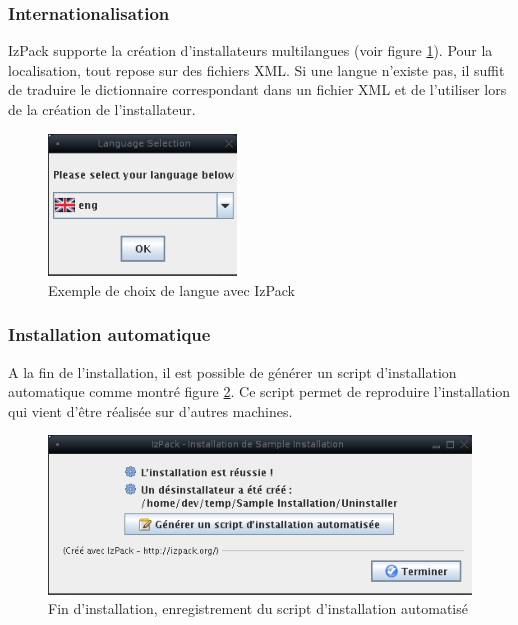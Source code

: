 \subsubsection{Internationalisation}
IzPack supporte la création d'installateurs multilangues (voir figure \ref{fig:LangChoice}).
Pour la localisation, tout repose sur des fichiers XML.
Si une langue n'existe pas, il suffit de traduire le dictionnaire correspondant dans un fichier XML et de l'utiliser lors de la création de l'installateur.
\begin{figure}[H]
	\centering
	\includegraphics[width=5cm]{../image/LangChoice.png}
	\caption{Exemple de choix de langue avec IzPack}
	\label{fig:LangChoice}
\end{figure}
\subsubsection{Installation automatique}
A la fin de l'installation, il est possible de générer un script d'installation automatique comme montré figure \ref{fig:SaveInstallXML}.
Ce script permet de reproduire l'installation qui vient d'être réalisée sur d'autres machines.
\begin{figure}[H]
	\centering
	\includegraphics[width=12cm]{../image/SaveInstallXML.png}
	\caption{Fin d'installation, enregistrement du script d'installation automatisé}
	\label{fig:SaveInstallXML}
\end{figure}
